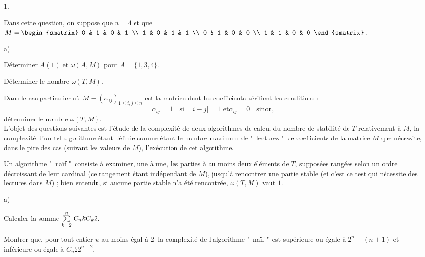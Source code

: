 \documentclass[11pt]{article}%
\begin{document}
\begin{noliste}{1.}
 \setlength{\itemsep}{4mm}
\item Dans cette question, on suppose que $n = 4$ et que $M = 
\begin{smatrix}
0 & 1 & 0 & 1 \\
1 & 0 & 1 & 1 \\
0 & 1 & 0 & 0 \\
1 & 1 & 0 & 0
\end{smatrix}
$.

\begin{noliste}{a)}
 \setlength{\itemsep}{2mm}
\item Déterminer $A(1)$ et $\omega (A,M)$ pour $A = \{1,3,4\}$.

\item Déterminer le nombre $\omega (T,M)$.
\end{noliste}

\item Dans le cas particulier où $M = (\alpha_{ij})_{1\leq i,j\leq
n}$ est la matrice dont les coefficients vérifient les conditions : 
\[
\alpha_{ij} = 1\quad \text{si}\quad \left| i-j\right| = 1\text{ et
}\alpha_{ij} = 0\quad \text{sinon},
\]
déterminer le nombre $\omega (T,M)$. \\
L'objet des questions suivantes est l'étude de la complexité de deux
algorithmes de calcul du nombre de stabilité de $T$ relativement à $M$,
la
complexité d'un tel algorithme étant définie comme étant le nombre
maximum
de "\ lectures "\ de coefficients de la matrice $M$ que nécessite, dans
le
pire des cas (suivant les valeurs de $M$), l'exécution de cet
algorithme.

\item Un algorithme "\ naïf "\ consiste à examiner, une à une, les
parties à
au moins deux éléments de $T$, supposées rangées selon un ordre
décroissant
de leur cardinal (ce rangement étant indépendant de $M$), jusqu'à
rencontrer
une partie stable (et c'est ce test qui nécessite des lectures dans
$M$) ;
bien entendu, si aucune partie stable n'a été rencontrée, $\omega
(T,M)$
vaut $1$.

\begin{noliste}{a)}
 \setlength{\itemsep}{2mm}
\item Calculer la somme ${\textstyle\sum\limits_{k = 2}^{n}}\hspace{.1cm}C_{n}{k}C_{k}{2}$.

\item Montrer que, pour tout entier $n$ au moins égal à $2$, la
complexité
de l'algorithme "\ naïf "\ est supérieure ou égale à $2^{n}-(n + 1)$ et
inférieure ou égale à $C_{n}{2}2^{n-2}$.
\end{noliste}


\end{noliste}
\end{document}
